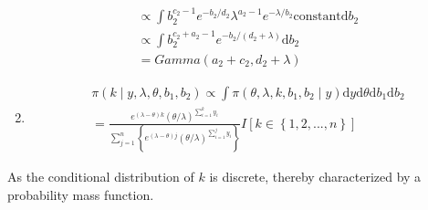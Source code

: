 \documentclass[lecture,12pt,]{pcms-l}
\numberwithin{section}{chapter}
\numberwithin{equation}{chapter}
\theoremstyle{plain}
\theoremstyle{definition}
\theoremstyle{definition}
\begin{document}
\begin{enumerate}
\begin{equation*}
\begin{split}
\\
\propto \int b_{2}^{c_2-1}e^{-b_2/d_2} \lambda^{a_2-1} e^{-\lambda/b_2}\text{constant} \mathrm{d} b_2
\\
\propto \int b_{2}^{c_2+a_2-1} e^{-b_2/(d_2+\lambda)} \mathrm{d} b_2 
\\
=Gamma(a_2 +c_2,d_2+\lambda)
\end{split}
\end{equation*}
\item
\begin{equation*}
\begin{split}
\pi(k \mid y ,\lambda, \theta,b_1,b_2 ) \propto \int \pi(\theta,\lambda,k,b_1,b_2 \mid y) \mathrm{d}y \mathrm{d} \theta  \mathrm{d} b_1 \mathrm{d} b_2
\\
= \frac{ e^{(\lambda-\theta)k} (\theta / \lambda)^{\sum_{i=1}^{k} y_i}}{\sum_{j=1}^{n} \left \{ e^{(\lambda-\theta)j}   (\theta / \lambda)^{\sum_{i=1}^{j} y_i} \right \} } I \left [ k \in \left \{ 1,2,...,n \right \} \right ]
\end{split}
\end{equation*}

\end{enumerate}
As the conditional distribution of $k$ is discrete, thereby characterized by a probability mass function.
\end{document}

